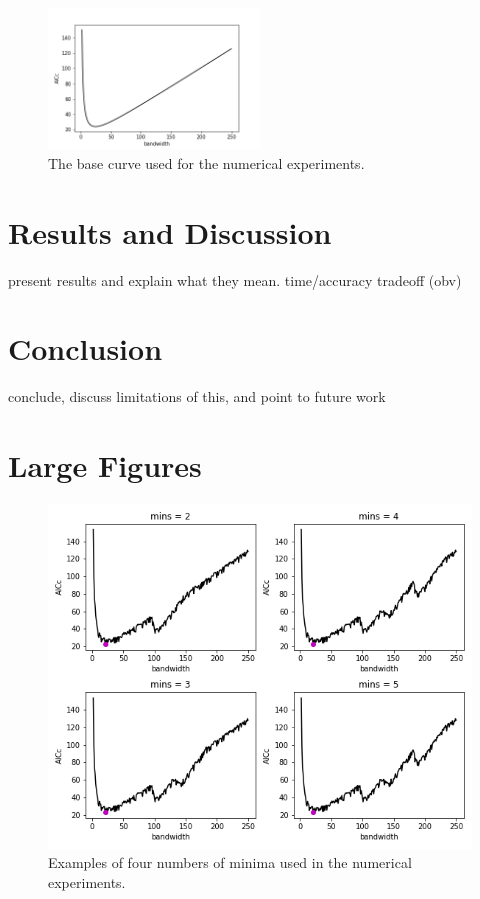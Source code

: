 \documentclass[letterpaper,12pt,twocolumn]{article}
\begin{document}
\begin{figure}
    \centering
    \includegraphics[width=0.5\textwidth]{../figures/baseline.png} 
    \caption{The base curve used for the numerical experiments.}
    \label{fig:baseline}
\end{figure}

\section{Results and Discussion}
\label{sec:results}
present results and explain what they mean. time/accuracy tradeoff (obv)

\section{Conclusion}
\label{sec:conclusion}
conclude, discuss limitations of this, and point to future work

\printbibliography
\pagebreak

\onecolumn
\section*{Large Figures}
\label{sec:figs}

\begin{figure}[h!]
    \centering
    \includegraphics[width=\textwidth]{../figures/multiple-mins-curves.png}
    \caption{Examples of four numbers of minima used in the numerical experiments.}
    \label{fig:multiple-mins}
\end{figure}
\end{document}
